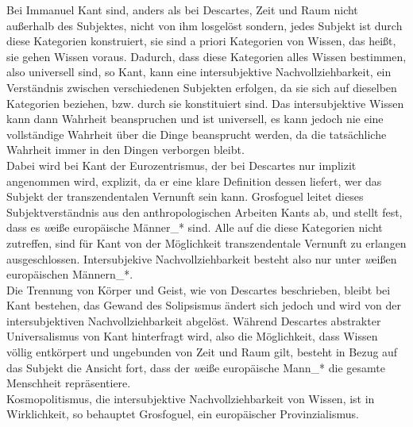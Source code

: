 Bei Immanuel Kant sind, anders als bei Descartes, Zeit und Raum nicht außerhalb
des Subjektes, nicht von ihm losgelöst sondern, jedes Subjekt ist durch diese
Kategorien konstruiert, sie sind a priori Kategorien von Wissen, das heißt, sie
gehen Wissen voraus.  Dadurch, dass diese Kategorien alles Wissen bestimmen,
also universell sind, so Kant, kann eine intersubjektive Nachvollziehbarkeit,
ein Verständnis zwischen verschiedenen Subjekten erfolgen, da sie sich auf
dieselben Kategorien beziehen, bzw. durch sie konstituiert sind.\footnotemark
{} Das intersubjektive Wissen kann dann Wahrheit
beanspruchen und ist universell, es kann jedoch nie eine vollständige Wahrheit
über die Dinge beansprucht werden, da die tatsächliche Wahrheit immer in den
Dingen verborgen bleibt. \\
Dabei wird bei Kant der Eurozentrismus, der bei Descartes nur implizit
angenommen wird, explizit, da er eine klare Definition dessen liefert, wer das
Subjekt der transzendentalen Vernunft sein kann. Grosfoguel leitet dieses
Subjektverständnis aus den anthropologischen Arbeiten Kants ab, und stellt
fest, dass es \textit{w}eiße europäische Männer\_* sind. Alle auf die diese Kategorien
nicht zutreffen, sind für Kant von der Möglichkeit transzendentale Vernunft zu
erlangen ausgeschlossen.\footnotemark {}
 Intersubjekive Nachvollziehbarkeit besteht also nur
unter \textit{w}eißen europäischen Männern\_*.\\

\noindent Die Trennung von Körper und Geist, wie von Descartes beschrieben, bleibt bei
Kant bestehen, das Gewand des Solipsismus ändert sich jedoch und wird von der
intersubjektiven Nachvollziehbarkeit abgelöst. Während Descartes abstrakter
Universalismus von Kant hinterfragt wird, also die Möglichkeit, dass Wissen
völlig entkörpert und ungebunden von Zeit und Raum gilt, besteht in Bezug auf
das Subjekt die Ansicht fort, dass der \textit{w}eiße europäische Mann\_* die gesamte
Menschheit repräsentiere. \\
Kosmopolitismus, die intersubjektive
Nachvollziehbarkeit von Wissen, ist in Wirklichkeit, so behauptet Grosfoguel,
ein europäischer Provinzialismus.\\

